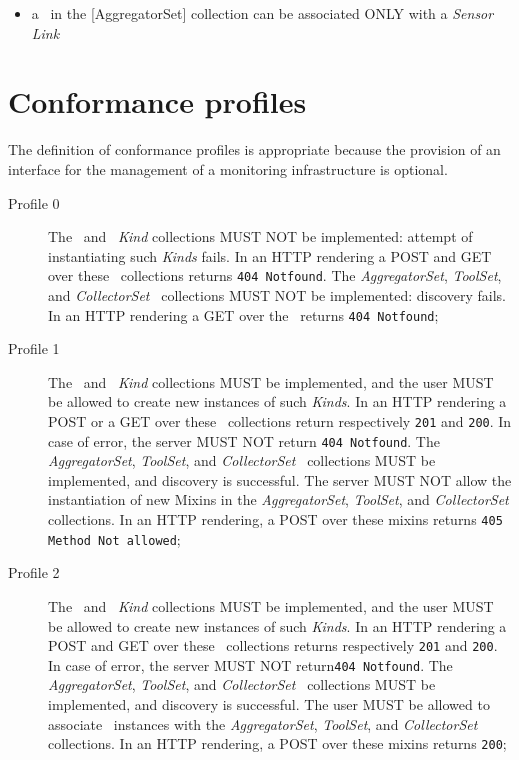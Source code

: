 \documentclass[12pt]{article}  %
\begin{document}
{\begin{itemize}
\item a \mi\ in the [{AggregatorSet}] collection can be associated ONLY with a {\em Sensor Link}

\end{itemize}


\section{Conformance profiles}

The definition of conformance profiles is appropriate because the provision of an interface for the management of a monitoring infrastructure is optional. 

\begin{description}

\item[Profile 0] The \coll\ and \sens\ {\em Kind} collections MUST NOT be implemented: attempt of instantiating such {\em Kinds} fails.  In an HTTP rendering a POST and GET over these \rs\ collections returns {\tt 404 Notfound}. The {\em AggregatorSet}, {\em ToolSet}, and {\em CollectorSet} \mi\ collections MUST NOT be implemented: discovery fails. In an HTTP rendering a GET over the \mi\ returns {\tt 404 Notfound}; 

\item[Profile 1] The \coll\ and \sens\ {\em Kind} collections MUST be implemented, and the user MUST be allowed to create new instances of such {\em Kinds}.  In an HTTP rendering a POST or a GET over these \rs\ collections return respectively {\tt 201} and {\tt 200}. In case of error, the server MUST NOT return {\tt 404 Notfound}. The {\em AggregatorSet}, {\em ToolSet}, and {\em CollectorSet} \mi\ collections MUST be implemented, and discovery is successful. The server MUST NOT allow the instantiation of new Mixins in the {\em AggregatorSet}, {\em ToolSet}, and {\em CollectorSet} collections. In an HTTP rendering, a POST over these mixins returns {\tt 405 Method Not allowed}; 

\item[Profile 2]  The \coll\ and \sens\ {\em Kind} collections MUST be implemented, and the user MUST be allowed to create new instances of such {\em Kinds}.  In an HTTP rendering a POST and GET over these \rs\ collections returns respectively {\tt 201} and {\tt 200}. In case of error, the server MUST NOT return{\tt 404 Notfound}. The {\em AggregatorSet}, {\em ToolSet}, and {\em CollectorSet} \mi\ collections MUST be implemented, and discovery is successful. The user MUST be allowed to associate \mi\ instances with the  {\em AggregatorSet}, {\em ToolSet}, and {\em CollectorSet} collections. In an HTTP rendering, a POST over these mixins returns {\tt 200};


\end{description}}
\end{document}
